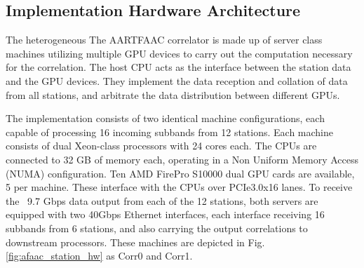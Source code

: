 \documentclass{ws-jai}
\begin{document}
\subsection  {Implementation  Hardware  Architecture} 
The heterogeneous  The AARTFAAC correlator  is made  up of server  class machines
utilizing multiple  GPU devices to carry  out the computation necessary  for the
correlation.  The  host CPU acts as  the interface between the  station data and
the GPU devices.   They implement the data reception and  collation of data from
all stations, and arbitrate the data distribution between different GPUs.







The  implementation  consists  of  two identical  machine  configurations,  each
capable  of processing  16  incoming  subbands from  12  stations. Each  machine
consists  of  dual Xeon-class  processors  with  24  cores  each. The  CPUs  are
connected to  32 GB  of memory each,  operating in a  Non Uniform  Memory Access
(NUMA) configuration.   Ten AMD FirePro S10000  dual GPU cards are  available, 5
per machine. These interface with the CPUs over PCIe3.0x16 lanes. To receive the
~9.7 Gbps data  output from each of  the 12 stations, both  servers are equipped
with two 40Gbps Ethernet interfaces, each interface receiving 16 subbands from 6
stations,   and   also   carrying   the  output   correlations   to   downstream
processors. These  machines are depicted in  Fig.  \ref{fig:afaac_station_hw} as
Corr0 and Corr1.\\
\end{document}
